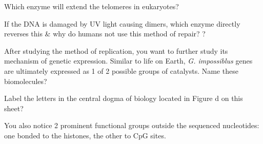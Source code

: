 \documentclass[addpoints]{exam}
\begin{document}
\begin{questions}
\question[2] Which enzyme will extend the telomeres in eukaryotes? \fillin[Telomerase][0pt]

\question[3] If the DNA is damaged by UV light causing dimers, which enzyme directly reverses this \& why do humans not use this method of repair? ? 

\question[4] After studying the method of replication, you want to further study its mechanism of genetic expression. Similar to life on Earth, \textit{G. impossiblus} genes are ultimately expressed as 1 of 2 possible groups of catalysts. Name these biomolecules? 

\question[5] Label the letters in the central dogma of biology located in Figure d on this sheet?



\question You also notice 2 prominent functional groups outside the sequenced nucleotides: one bonded to the histones, the other to CpG sites.


\end{questions}
\end{document}

